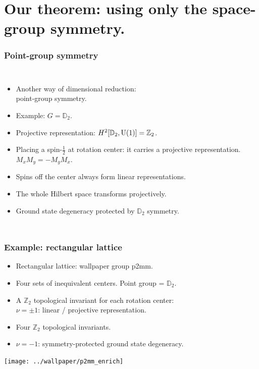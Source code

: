 \documentclass[xcolor=table, 10pt, aspectratio=169]{beamer}
\begin{document}
\section{Our theorem: using only the space-group symmetry.}

\begin{frame}
\frametitle{Point-group symmetry}
\begin{columns}
\begin{itemize}
\item Another way of dimensional reduction:\\ point-group symmetry.
\item Example: $G=\mathbb D_2$.
\item Projective representation: $H^2[\mathbb D_2, \text U(1)]=\mathbb Z_2$.
\item Placing a spin-$\frac12$ at rotation center: it carries a projective representation. $M_xM_y=-M_yM_x$.
\item Spins off the center always form linear representations.
\item The whole Hilbert space transforms projectively.
\item Ground state degeneracy protected by $\mathbb D_2$ symmetry.
\end{itemize}
\end{columns}
\end{frame}

\begin{frame}
\frametitle{Example: rectangular lattice}
\begin{itemize}
\item Rectangular lattice: wallpaper group p2mm.
\item Four sets of inequivalent centers. Point group = $\mathbb D_2$.
\item A $\mathbb Z_2$ topological invariant for each rotation center:\\
  $\nu=\pm1$: linear / projective representation.
\item Four $\mathbb Z_2$ topological invariants.
\item $\nu=-1$: symmetry-protected ground state degeneracy.
\end{itemize}
\begin{center}
\texttt{[image: ../wallpaper/p2mm\_enrich]}
\end{center}
\end{frame}
\end{document}
